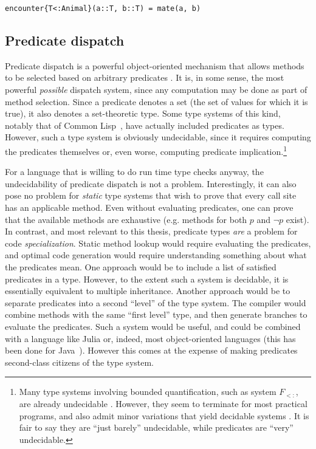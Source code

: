 \begin{verbatim}
encounter{T<:Animal}(a::T, b::T) = mate(a, b)
\end{verbatim}



\subsection{Predicate dispatch}


Predicate dispatch is a powerful object-oriented mechanism that allows
methods to be selected based on arbitrary predicates \cite{ErnstKC98}.
It is, in some sense, the most powerful \emph{possible} dispatch system,
since any computation may be done as part of method selection.
Since a predicate denotes a set (the set of values for which it is true),
it also denotes a set-theoretic type.
Some type systems of this kind, notably that of Common
Lisp~\cite{steele1990common:types}, have actually included predicates as types.
However, such a type system is obviously undecidable, since it
requires computing the predicates themselves or, even worse, computing
predicate implication.\footnote{
Many type systems involving bounded quantification, such as system $F_{<:}$,
are already undecidable \cite{Pierce1994131}.
However, they seem to terminate for most practical programs, and also admit
minor variations that yield decidable systems \cite{Castagna:1994:DBQ:174675.177844}.
It is fair to say they are ``just barely'' undecidable, while predicates
are ``very'' undecidable.
}

For a language that is willing to do run time type checks anyway, the
undecidability of predicate dispatch is not a problem.
Interestingly, it can also pose no problem for \emph{static} type systems
that wish to prove that every call site has an applicable method.
Even without evaluating predicates, one can prove that the available methods
are exhaustive (e.g. methods for both $p$ and $\neg p$ exist).
In contrast, and most relevant to this thesis, predicate types \emph{are} a
problem for code \emph{specialization}.
Static method lookup would require evaluating the predicates, and optimal code
generation would require understanding something about what the predicates mean.
One approach would be to include a list of satisfied predicates in a type.
However, to the extent such a system is decidable, it is essentially equivalent
to multiple inheritance.
Another approach would be to separate predicates into a second ``level'' of the
type system.
The compiler would combine methods with the same ``first level'' type, and then
generate branches to evaluate the predicates.
Such a system would be useful, and could be
combined with a language like Julia or, indeed, most object-oriented
languages (this has been done for Java~\cite{Millstein:2009:EMP:1462166.1462168}).
However this comes at the expense of making predicates second-class
citizens of the type system.

